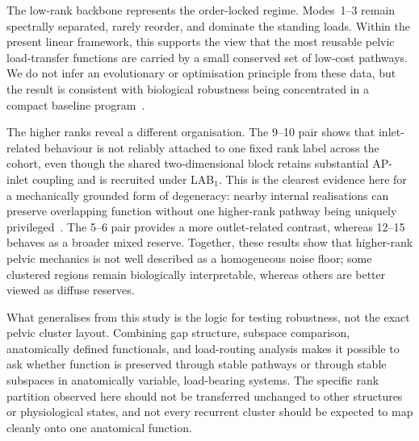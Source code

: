 \documentclass[11pt]{article}
\newcommand{\LABone}{LAB$_1$}
\begin{document}
The low-rank backbone represents the order-locked regime.
Modes~1--3 remain spectrally separated, rarely reorder, and dominate the standing loads.
Within the present linear framework, this supports the view that the most reusable pelvic load-transfer functions are carried by a small conserved set of low-cost pathways.
We do not infer an evolutionary or optimisation principle from these data, but the result is consistent with biological robustness being concentrated in a compact baseline program~\citep{Kitano2007,Whitacre2010}.

The higher ranks reveal a different organisation.
The 9--10 pair shows that inlet-related behaviour is not reliably attached to one fixed rank label across the cohort, even though the shared two-dimensional block retains substantial AP-inlet coupling and is recruited under \LABone.
This is the clearest evidence here for a mechanically grounded form of degeneracy: nearby internal realisations can preserve overlapping function without one higher-rank pathway being uniquely privileged~\citep{Whitacre2010,Whitacre2012}.
The 5--6 pair provides a more outlet-related contrast, whereas 12--15 behaves as a broader mixed reserve.
Together, these results show that higher-rank pelvic mechanics is not well described as a homogeneous noise floor; some clustered regions remain biologically interpretable, whereas others are better viewed as diffuse reserves.

What generalises from this study is the logic for testing robustness, not the exact pelvic cluster layout.
Combining gap structure, subspace comparison, anatomically defined functionals, and load-routing analysis makes it possible to ask whether function is preserved through stable pathways or through stable subspaces in anatomically variable, load-bearing systems.
The specific rank partition observed here should not be transferred unchanged to other structures or physiological states, and not every recurrent cluster should be expected to map cleanly onto one anatomical function.
\end{document}
